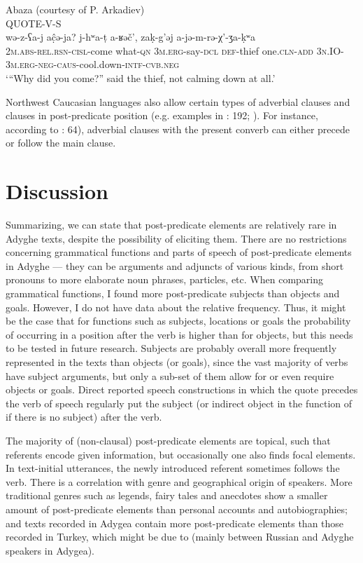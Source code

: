 \documentclass[output=paper,colorlinks,citecolor=brown, draft]{langscibook}
\begin{document}
\ea\label{Adyghe:ex:49}
Abaza (courtesy of P. Arkadiev) \\
QUOTE-V-S \\
\gll wə-z-ʕa-j aĉ̣ə-ja? j-hʷa-ṭ a-ʁəč', zaḳ-g'əj a-jə-m-rə-χ'-ʒa-ḳʷa\\
\textsc{2m.abs-}\textsc{rel.rsn-cisl-}come what\textsc{-qn} \textsc{3m.erg-}say\textsc{-dcl} \textsc{def-}thief one\textsc{.cln-add} \textsc{3n.IO-3m.erg-neg-caus-}cool.down\textsc{-intf-cvb.neg}\\
\glt `{}``Why did you come?'' said the thief, not calming down at all.' 
\z

Northwest Caucasian languages also allow certain types of adverbial clauses and  clauses in post-predicate position (e.g. examples in \citealt{kumakhov2009circassian}: 192; \citealt{arkadiev2020abaza}). For instance, according to \citealt{chirikba2003abkhaz}: 64), adverbial clauses with the present converb can either precede or follow the main clause.


\section{Discussion}\label{Adyghe:ss:5}

Summarizing, we can state that post-predicate elements are relatively rare in Adyghe texts, despite the possibility of eliciting them. There are no restrictions concerning grammatical functions and parts of speech of post-predicate elements in Adyghe --- they can be arguments and adjuncts of various kinds, from short pronouns to more elaborate noun phrases, particles, etc. When comparing grammatical functions, I found more post-predicate subjects than objects and goals. However, I do not have data about the relative frequency. Thus, it might be the case that for functions such as subjects, locations or goals the probability of occurring in a position after the verb is higher than for objects, but this needs to be tested in future research. Subjects are probably overall more frequently represented in the texts than objects (or goals), since the vast majority of verbs have subject arguments, but only a sub-set of them allow for or even require objects or goals. Direct reported speech constructions in which the quote precedes the verb of speech regularly put the subject (or indirect object in the function of  if there is no subject) after the verb.

The majority of (non-clausal) post-predicate elements are topical, such that referents encode given information, but occasionally one also finds focal elements. In text-initial utterances, the newly introduced referent sometimes follows the verb. There is a correlation with genre and geographical origin of speakers. More traditional genres such as legends, fairy tales and anecdotes show a smaller amount of post-predicate elements than personal accounts and autobiographies; and texts recorded in Adygea contain more post-predicate elements than those recorded in Turkey, which might be due to  (mainly between Russian and Adyghe speakers in Adygea).
\end{document}
